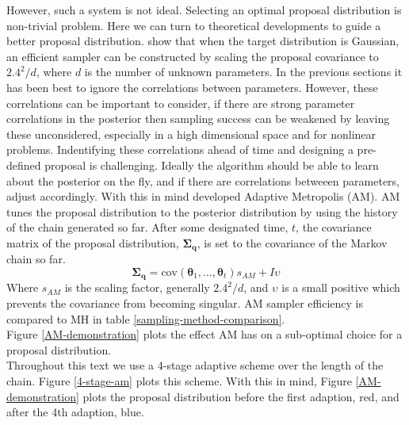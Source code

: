 However, such a system is not ideal. Selecting an optimal proposal distribution is non-trivial problem. Here we can turn to theoretical developments to guide a better proposal distribution. \citet{Gelman1996} show that when the target distribution is Gaussian, an efficient sampler can be constructed by scaling the proposal covariance to $2.4^2/d$, where $d$ is the number of unknown parameters. In the previous sections it has been best to ignore the correlations between parameters. However, these correlations can be important to consider, if there are strong parameter correlations in the posterior then sampling success can be weakened by leaving these unconsidered, especially in a high dimensional space and for nonlinear problems. Indentifying these correlations ahead of time and designing a pre-defined proposal is challenging. Ideally the algorithm should be able to learn about the posterior on the fly, and if there are correlations betweeen parameters, adjust accordingly. With this in mind \citet{haario2001} developed Adaptive Metropolis (AM). AM tunes the proposal distribution to the posterior distribution by using the history of the chain generated so far. After some designated time, $t$, the covariance matrix of the proposal distribution, $\bm{\Sigma_q}$, is set to the covariance of the Markov chain so far. 
\begin{equation}
\bm{\Sigma_q} = \text{cov}(\bm{\theta}_1,\dots,\bm{\theta}_t)s_{AM} + I\upsilon
\end{equation}
Where $s_{AM}$ is the scaling factor, generally $2.4^2/d$, and $\upsilon$ is a small positive which prevents the covariance from becoming singular. AM sampler efficiency is compared to MH in table \ref{sampling-method-comparison}.\\

Figure \ref{AM-demonstration} plots the effect AM has on a sub-optimal choice for a proposal distribution.\\

Throughout this text we use a 4-stage adaptive scheme over the length of the chain. Figure \ref{4-stage-am} plots this scheme. With this in mind, Figure \ref{AM-demonstration} plots the proposal distribution before the first adaption, red, and after the 4th adaption, blue. \\
\linebreak
\linebreak
\linebreak

